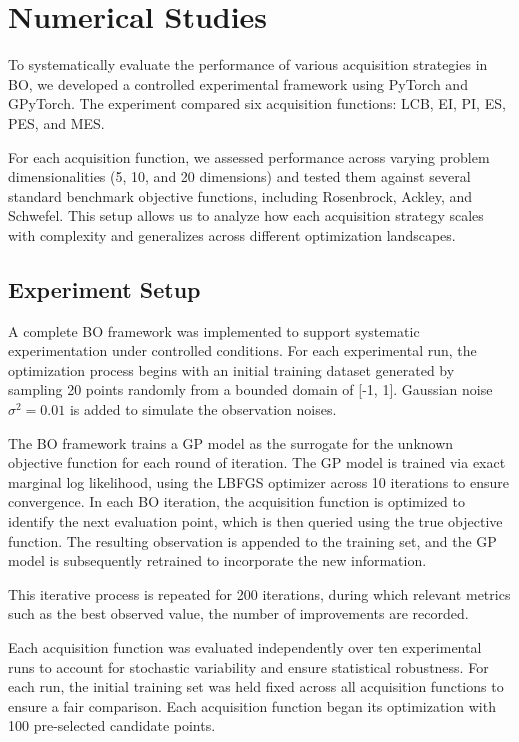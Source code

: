 \documentclass{ut-thesis}
\begin{document}
\chapter{Numerical Studies}

To systematically evaluate the performance of various acquisition strategies in BO, we developed a controlled experimental framework using PyTorch and GPyTorch. The experiment compared six acquisition functions: LCB, EI, PI, ES, PES, and MES.

For each acquisition function, we assessed performance across varying problem dimensionalities (5, 10, and 20 dimensions) and tested them against several standard benchmark objective functions, including Rosenbrock, Ackley, and Schwefel. This setup allows us to analyze how each acquisition strategy scales with complexity and generalizes across different optimization landscapes.

\section{Experiment Setup}

A complete BO framework was implemented to support systematic experimentation under controlled conditions. For each experimental run, the optimization process begins with an initial training dataset generated by sampling 20 points randomly from a bounded domain of [-1, 1]. Gaussian noise $\sigma^2 = 0.01$  is added to simulate the observation noises.

The BO framework trains a GP model as the surrogate for the unknown objective function for each round of iteration. The GP model is trained via exact marginal log likelihood, using the LBFGS optimizer across 10 iterations to ensure convergence. In each BO iteration, the acquisition function is optimized to identify the next evaluation point, which is then queried using the true objective function. The resulting observation is appended to the training set, and the GP model is subsequently retrained to incorporate the new information.

This iterative process is repeated for 200 iterations, during which relevant metrics such as the best observed value, the number of improvements are recorded.

Each acquisition function was evaluated independently over ten experimental runs to account for stochastic variability and ensure statistical robustness. For each run, the initial training set was held fixed across all acquisition functions to ensure a fair comparison. Each acquisition function began its optimization with 100 pre-selected candidate points.
\end{document}

